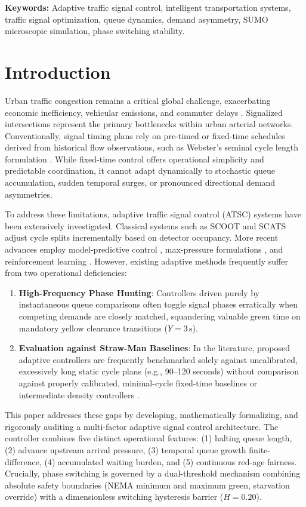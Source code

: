\documentclass[11pt,journal,onecolumn]{article}
\begin{document}
\textbf{Keywords:} Adaptive traffic signal control, intelligent transportation systems, traffic signal optimization, queue dynamics, demand asymmetry, SUMO microscopic simulation, phase switching stability.

\section{Introduction}
Urban traffic congestion remains a critical global challenge, exacerbating economic inefficiency, vehicular emissions, and commuter delays \cite{papageorgiou2003review}. Signalized intersections represent the primary bottlenecks within urban arterial networks. Conventionally, signal timing plans rely on pre-timed or fixed-time schedules derived from historical flow observations, such as Webster's seminal cycle length formulation \cite{webster1958traffic}. While fixed-time control offers operational simplicity and predictable coordination, it cannot adapt dynamically to stochastic queue accumulation, sudden temporal surges, or pronounced directional demand asymmetries.

To address these limitations, adaptive traffic signal control (ATSC) systems have been extensively investigated. Classical systems such as SCOOT \cite{hunt1981scoot} and SCATS \cite{sims1980sydney} adjust cycle splits incrementally based on detector occupancy. More recent advances employ model-predictive control \cite{wongpiromsarn2012distributed}, max-pressure formulations \cite{varaiya2013max}, and reinforcement learning \cite{wei2018intellilight, wei2019survey}. However, existing adaptive methods frequently suffer from two operational deficiencies:
\begin{enumerate}
    \item \textbf{High-Frequency Phase Hunting}: Controllers driven purely by instantaneous queue comparisons often toggle signal phases erratically when competing demands are closely matched, squandering valuable green time on mandatory yellow clearance transitions ($Y = 3\,\text{s}$).
    \item \textbf{Evaluation against Straw-Man Baselines}: In the literature, proposed adaptive controllers are frequently benchmarked solely against uncalibrated, excessively long static cycle plans (e.g., 90–120 seconds) without comparison against properly calibrated, minimal-cycle fixed-time baselines or intermediate density controllers \cite{genders2016using}.
\end{enumerate}

This paper addresses these gaps by developing, mathematically formalizing, and rigorously auditing a multi-factor adaptive signal control architecture. The controller combines five distinct operational features: (1) halting queue length, (2) advance upstream arrival pressure, (3) temporal queue growth finite-difference, (4) accumulated waiting burden, and (5) continuous red-age fairness. Crucially, phase switching is governed by a dual-threshold mechanism combining absolute safety boundaries (NEMA minimum and maximum green, starvation override) with a dimensionless switching hysteresis barrier ($H = 0.20$).
\end{document}
